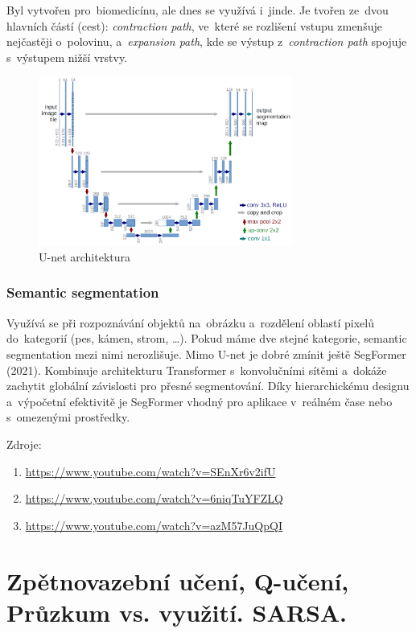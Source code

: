 Byl vytvořen pro~biomedicínu, ale dnes se využívá i~jinde.
Je tvořen ze~dvou hlavních částí (cest):
\emph{contraction path}, ve~které se rozlišení vstupu zmenšuje nejčastěji o~polovinu,
a~\emph{expansion path}, kde se výstup z~\emph{contraction path} spojuje s~výstupem nižší vrstvy.

\begin{figure}[h]
    \centering
    \includegraphics[height=15em]{images/09_unet.png}
    \caption{U-net architektura}
    \label{U-net}
\end{figure}

\subsubsection{Semantic segmentation}

Využívá se při rozpoznávání objektů na~obrázku a~rozdělení oblastí pixelů do~kategorií (pes, kámen, strom, \dots). Pokud máme dve stejné kategorie, semantic segmentation mezi nimi nerozlišuje. Mimo U-net je dobré zmínit ještě SegFormer (2021). Kombinuje architekturu Transformer s~konvolučními sítěmi a~dokáže zachytit globální závislosti pro přesné segmentování. Díky hierarchickému designu a~výpočetní efektivitě je SegFormer vhodný pro aplikace v~reálném čase nebo s~omezenými prostředky.




Zdroje:
\begin{enumerate}
    \item \url{https://www.youtube.com/watch?v=SEnXr6v2ifU}
    \item \url{https://www.youtube.com/watch?v=6niqTuYFZLQ}
    \item \url{https://www.youtube.com/watch?v=azM57JuQpQI}
\end{enumerate}



\clearpage
\section{Zpětnovazební učení, Q-učení, Průzkum vs. využití. SARSA.}

